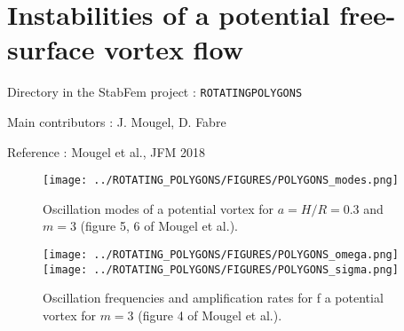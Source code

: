 
\chapter{Instabilities of a potential free-surface vortex flow}

\begin{description}
\item{Directory in the StabFem project :}  \texttt{ROTATINGPOLYGONS}
\item{Main contributors :} J. Mougel, D. Fabre
\item{Reference :} Mougel et al., JFM 2018 
\end{description}

\begin{figure}
\texttt{[image: ../ROTATING\_POLYGONS/FIGURES/POLYGONS\_modes.png]}
\caption{Oscillation modes of a potential vortex for  $a=H/R=0.3$ and $m=3$ (figure 5, 6 of Mougel et al.).}
\label{Bridges_NV_Eigenmodes_phi_cyl_L3_5}
\end{figure}

\begin{figure}
\texttt{[image: ../ROTATING\_POLYGONS/FIGURES/POLYGONS\_omega.png]}
\texttt{[image: ../ROTATING\_POLYGONS/FIGURES/POLYGONS\_sigma.png]}
\caption{Oscillation frequencies and amplification rates for f a potential vortex for $m=3$ (figure 4 of Mougel et al.).}
\label{Bridges_NV_Eigenmodes_phi_cyl_L3_5}
\end{figure}
 